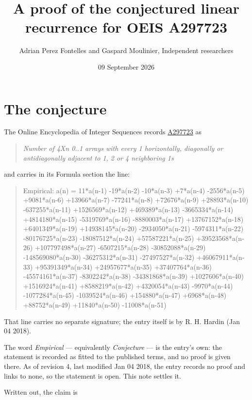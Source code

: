 \documentclass[11pt]{article}
\title{A proof of the conjectured linear recurrence for OEIS A297723}
\author{Adrian Perez Fontelles and Gaspard Moulinier, Independent researchers}
\date{09 September 2026}
\theoremstyle{definition}
\begin{document}
\maketitle
\section{The conjecture}

The Online Encyclopedia of Integer Sequences records \href{https://oeis.org/A297723}{A297723} as

\begin{quote}\itshape Number of 4Xn 0..1 arrays with every 1 horizontally, diagonally or antidiagonally adjacent to 1, 2 or 4 neighboring 1s\end{quote}

and carries in its Formula section the line:

\begin{quote}\ttfamily Empirical: a(n) = 11*a(n-1) -19*a(n-2) -10*a(n-3) +7*a(n-4) -2556*a(n-5) +9081*a(n-6) +13966*a(n-7) -77241*a(n-8) +72676*a(n-9) +28893*a(n-10) -637255*a(n-11) +1526569*a(n-12) +469389*a(n-13) -3665334*a(n-14) +4814180*a(n-15) -5319769*a(n-16) -8880003*a(n-17) +13767152*a(n-18) +6401349*a(n-19) +14938145*a(n-20) -2934050*a(n-21) -5974311*a(n-22) -80176725*a(n-23) -18087512*a(n-24) +57587221*a(n-25) +39523568*a(n-26) +107797498*a(n-27) -6507215*a(n-28) -30852088*a(n-29) -148569080*a(n-30) -36275312*a(n-31) -27497527*a(n-32) +46067911*a(n-33) +95391349*a(n-34) +24957677*a(n-35) +37407764*a(n-36) -45574161*a(n-37) -8302242*a(n-38) -34381868*a(n-39) +1027606*a(n-40) +1516924*a(n-41) +8588219*a(n-42) +4320054*a(n-43) -9970*a(n-44) -1077284*a(n-45) -1039524*a(n-46) +154880*a(n-47) +6968*a(n-48) +88752*a(n-49) +11840*a(n-50) -11008*a(n-51)\end{quote}

That line carries no separate signature; the entry itself is by R. H. Hardin (Jan 04 2018).

The word {\itshape Empirical} --- equivalently {\itshape Conjecture} --- is the entry's own: the statement is recorded as fitted to the published terms, and no proof is given there. As of revision 4, last modified Jan 04 2018, the entry records no proof and links to none, so the statement is open. This note settles it.

Written out, the claim is
\end{document}
